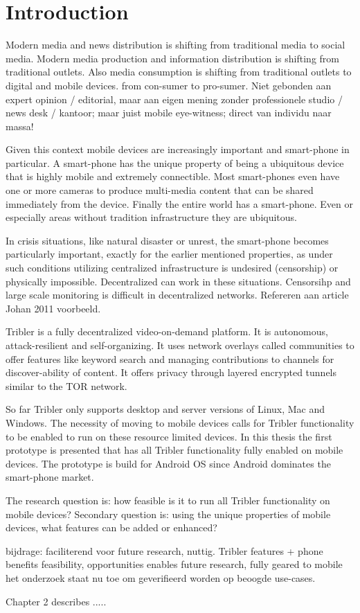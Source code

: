 \chapter{Introduction}

Modern media and news distribution is shifting from traditional media to social media.
Modern media production and information distribution is shifting from traditional outlets.
Also media consumption is shifting from traditional outlets to digital and mobile devices.
from con-sumer to pro-sumer.
Niet gebonden aan expert opinion / editorial, maar aan eigen mening zonder professionele studio / news desk / kantoor; maar juist mobile eye-witness; direct van individu naar massa!

Given this context mobile devices are increasingly important and smart-phone in particular.
A smart-phone has the unique property of being a ubiquitous device that is highly mobile and extremely connectible.
Most smart-phones even have one or more cameras to produce multi-media content that can be shared immediately from the device.
Finally the entire world has a smart-phone.
Even or especially areas without tradition infrastructure they are ubiquitous.

In crisis situations, like natural disaster or unrest, the smart-phone becomes particularly important, exactly for the earlier mentioned properties, as under such conditions utilizing centralized infrastructure is undesired (censorship) or physically impossible.
Decentralized can work in these situations.
Censorsihp and large scale monitoring is difficult in decentralized networks.
Refereren aan article Johan 2011 voorbeeld.


Tribler is a fully decentralized video-on-demand platform.
It is autonomous, attack-resilient and self-organizing.
It uses network overlays called communities to offer features like keyword search and managing contributions to channels for discover-ability of content.
It offers privacy through layered encrypted tunnels similar to the TOR network.

So far Tribler only supports desktop and server versions of Linux, Mac and Windows.
The necessity of moving to mobile devices calls for Tribler functionality to be enabled to run on these resource limited devices.
In this thesis the first prototype is presented that has all Tribler functionality fully enabled on mobile devices.
The prototype is build for Android OS since Android dominates the smart-phone market.


The research question is: how feasible is it to run all Tribler functionality on mobile devices? %
Secondary question is: using the unique properties of mobile devices, what features can be added or enhanced?


bijdrage: faciliterend voor future research, nuttig. Tribler features + phone benefits
feasibility, opportunities enables future research, fully geared to mobile
het onderzoek staat nu toe om geverifieerd worden op beoogde use-cases.



Chapter 2 describes .....